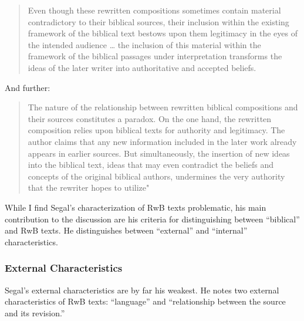 \begin{quote}
Even though these rewritten compositions sometimes contain material
contradictory to their biblical sources, their inclusion within the
existing framework of the biblical text bestows upon them legitimacy in
the eyes of the intended audience \ldots{} the inclusion of this
material within the framework of the biblical passages under
interpretation transforms the ideas of the later writer into
authoritative and accepted beliefs.\autocite[11]{segal_henze2005}
\end{quote}

And further:

\begin{quote}
The nature of the relationship between rewritten biblical compositions
and their sources constitutes a paradox. On the one hand, the rewritten
composition relies upon biblical texts for authority and legitimacy. The
author claims that any new information included in the later work
already appears in earlier sources. But simultaneously, the insertion of
new ideas into the biblical text, ideas that may even contradict the
beliefs and concepts of the original biblical authors, undermines the
very authority that the rewriter hopes to
utilize"\autocite[11-12]{segal_henze2005}
\end{quote}

While I find Segal's characterization of RwB texts problematic, his main
contribution to the discussion are his criteria for distinguishing
between ``biblical'' and RwB texts. He distinguishes between
``external'' and ``internal'' characteristics.

\hypertarget{external-characteristics}{%
\subsubsection{External
Characteristics}\label{external-characteristics}}

Segal's external characteristics are by far his weakest. He notes two
external characteristics of RwB texts: ``language'' and ``relationship
between the source and its revision.''

